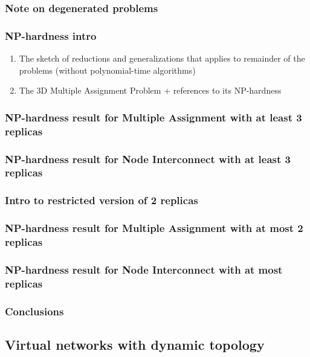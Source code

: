 \documentclass[a4paper]{article}
\begin{document}
\subsubsection{Note on degenerated problems}
\subsubsection{NP-hardness intro}
\begin{enumerate}
  \item The sketch of reductions and generalizations that applies to remainder of the problems (without polynomial-time algorithms)
  \item The 3D Multiple Assignment Problem + references to its NP-hardness
\end{enumerate}

\subsubsection{NP-hardness result for Multiple Assignment with at least 3 replicas}
\subsubsection{NP-hardness result for Node Interconnect with at least 3 replicas}

\subsubsection{Intro to restricted version of 2 replicas}

\subsubsection{NP-hardness result for Multiple Assignment with at most 2 replicas}
\subsubsection{NP-hardness result for Node Interconnect with at most replicas}

\subsubsection{Conclusions}

\subsection{Virtual networks with dynamic topology}
\end{document}
